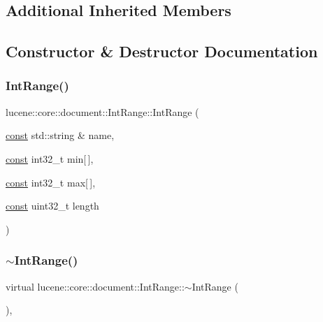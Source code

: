 \subsection*{Additional Inherited Members}


\subsection{Constructor \& Destructor Documentation}
\mbox{\label{classlucene_1_1core_1_1document_1_1IntRange_a9572f1e81eb49c78f88db1337d0500c7}} 
\subsubsection{\texorpdfstring{Int\+Range()}{IntRange()}}
{\footnotesize\ttfamily lucene\+::core\+::document\+::\+Int\+Range\+::\+Int\+Range (\begin{DoxyParamCaption}\item[{\mbox{\hyperlink{ZlibCrc32_8h_a2c212835823e3c54a8ab6d95c652660e}{const}} std\+::string \&}]{name,  }\item[{\mbox{\hyperlink{ZlibCrc32_8h_a2c212835823e3c54a8ab6d95c652660e}{const}} int32\+\_\+t}]{min\mbox{[}$\,$\mbox{]},  }\item[{\mbox{\hyperlink{ZlibCrc32_8h_a2c212835823e3c54a8ab6d95c652660e}{const}} int32\+\_\+t}]{max\mbox{[}$\,$\mbox{]},  }\item[{\mbox{\hyperlink{ZlibCrc32_8h_a2c212835823e3c54a8ab6d95c652660e}{const}} uint32\+\_\+t}]{length }\end{DoxyParamCaption})\hspace{0.3cm}{\ttfamily [inline]}}

\mbox{\label{classlucene_1_1core_1_1document_1_1IntRange_a4e18e6a37effdedc53bb88b4c56e7e71}} 
\subsubsection{\texorpdfstring{$\sim$\+Int\+Range()}{~IntRange()}}
{\footnotesize\ttfamily virtual lucene\+::core\+::document\+::\+Int\+Range\+::$\sim$\+Int\+Range (\begin{DoxyParamCaption}{ }\end{DoxyParamCaption})\hspace{0.3cm}{\ttfamily [inline]}, {\ttfamily [virtual]}}



